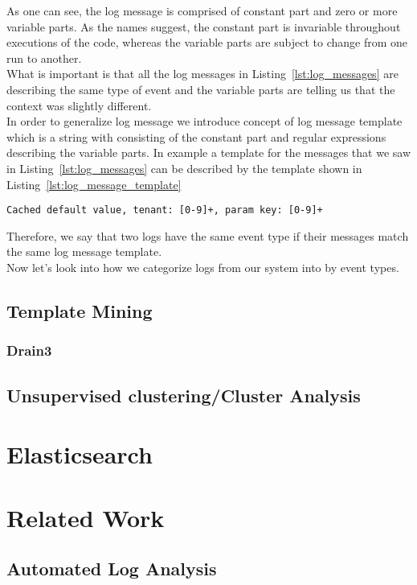 As one can see, the log message is comprised of constant part and zero or more variable parts.
As the names suggest, the constant part is invariable throughout executions of the code, whereas the variable parts are subject to change from one run to another.\\

What is important is that all the log messages in Listing~\ref{lst:log_messages} are describing the same type of event and the variable parts are telling us that the context was slightly different.\\
In order to generalize log message we introduce concept of log message template which is a string with consisting of the constant part and regular expressions describing the variable parts. In example a template for the messages that we saw in Listing~\ref{lst:log_messages} can be described by the template shown in Listing~\ref{lst:log_message_template}\\

\begin{lstlisting}[label={lst:log_message_template}, caption={Template for ~\ref{lst:log_messages}}, captionpos=b]
Cached default value, tenant: [0-9]+, param key: [0-9]+ 
\end{lstlisting}
Therefore, we say that two logs have the same event type if their messages match the same log message template.\\

Now let's look into how we categorize logs from our system into by event types.
    \subsection{Template Mining}
    \subsubsection{Drain3}
    \subsection{Unsupervised clustering/Cluster Analysis}
    
\section{Elasticsearch}
\section{Related Work}
\subsection{Automated Log Analysis}